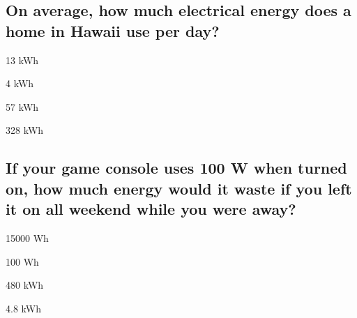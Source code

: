 \documentclass[11pt]{article}
\begin{document}
\subsection{On average, how much electrical energy does a home in Hawaii use per day?}

\begin{answer}
	\item 13 kWh
	\item 4 kWh
	\item 57 kWh
	\item 328 kWh
\end{answer}

\subsection{If your game console uses 100 W when turned on, how much energy would it waste if you left it on all weekend while you were away?}

\begin{answer}
	\item 15000 Wh
	\item 100 Wh
	\item 480 kWh
	\item 4.8 kWh
\end{answer}
\end{document}
